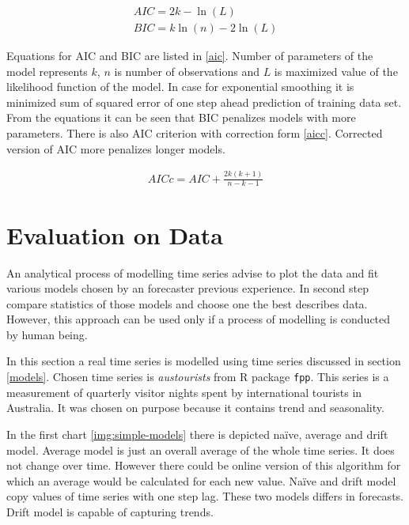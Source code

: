     \begin{gather} \label{aic}
        AIC = 2 k - \ln(L) \\ \nonumber
        BIC = k \ln(n) - 2 \ln(L)
    \end{gather}

    Equations for AIC and BIC are listed in \ref{aic}. Number of parameters of the model represents $k$, $n$ is number
    of observations and $L$ is maximized value of the likelihood function of the model. In case for exponential
    smoothing it is minimized sum of squared error of one step ahead prediction of training data set. From the
    equations it can be seen that BIC penalizes models with more parameters. There is also AIC criterion with
    correction form \ref{aicc}. Corrected version of AIC more penalizes longer models.

    \begin{eqnarray} \label{aicc}
        AICc = AIC + \frac{2k(k+1)}{n-k-1}
    \end{eqnarray}

    \section{Evaluation on Data}
    An analytical process of modelling time series advise to plot the data and fit various models chosen by an
    forecaster previous experience. In second step compare statistics of those models and choose one the best describes
    data. However, this approach can be used only if a process of modelling is conducted by human being.

    In this section a real time series is modelled using time series discussed in section \ref{models}.
    Chosen time series is \emph{austourists} from R package \texttt{fpp}. This series is a measurement of quarterly
    visitor nights spent by international tourists in Australia. It was chosen on purpose because it
    contains trend and seasonality.

    In the first chart \ref{img:simple-models} there is depicted na\"{i}ve, average and drift model. Average model is
    just an overall average of the whole time series. It does not change over time. However there could be online
    version of this algorithm for which an average would be calculated for each new value. Na\"{i}ve and drift model
    copy values of time series with one step lag. These two models differs in forecasts. Drift model is capable of
    capturing trends.

